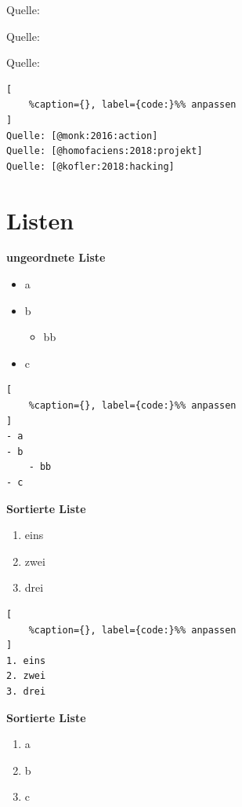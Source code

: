 Quelle: ~\textcite{monk:2016:action}

Quelle: ~\textcite{homofaciens:2018:projekt}

Quelle: ~\textcite{kofler:2018:hacking}

\lstset{language=C}%
\begin{lstlisting}[
	%caption={}, label={code:}%% anpassen
]
Quelle: [@monk:2016:action]
Quelle: [@homofaciens:2018:projekt]
Quelle: [@kofler:2018:hacking]
\end{lstlisting}

\section{Listen}\label{listen}

\textbf{ungeordnete Liste}

\begin{itemize}
\item
  a
\item
  b

  \begin{itemize}
  \item
    bb
  \end{itemize}
\item
  c
\end{itemize}

\lstset{language=C}%
\begin{lstlisting}[
	%caption={}, label={code:}%% anpassen
]
- a
- b
    - bb
- c
\end{lstlisting}

\textbf{Sortierte Liste}

\begin{enumerate}
\item
  eins
\item
  zwei
\item
  drei
\end{enumerate}

\lstset{language=C}%
\begin{lstlisting}[
	%caption={}, label={code:}%% anpassen
]
1. eins
2. zwei
3. drei
\end{lstlisting}

\textbf{Sortierte Liste}

\begin{enumerate}
\def\labelenumi{\alph{enumi})}
\item
  a
\item
  b
\item
  c
\end{enumerate}

